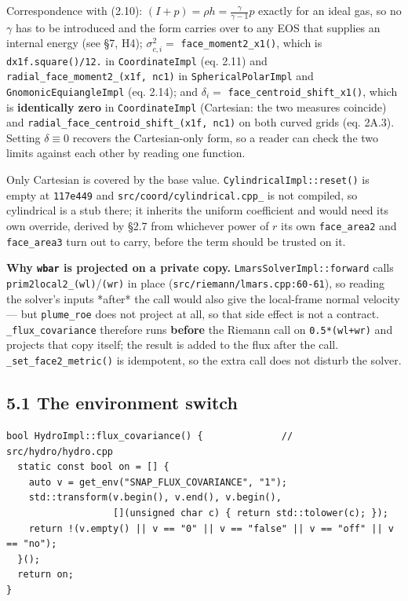 \documentclass[11pt,a4paper]{article}
\begin{document}
Correspondence with (2.10): $(I+p)=\rho h=\frac{\gamma}{\gamma-1}p$ exactly for an
ideal gas, so no $\gamma$ has to be introduced and the form carries over to any
EOS that supplies an internal energy (see §7, H4);
$\sigma^2_{c,i}=$ \texttt{face\_moment2\_x1()}, which is \texttt{dx1f.square()/12.} in
\texttt{CoordinateImpl} (eq. 2.11) and \texttt{radial\_face\_moment2\_(x1f, nc1)} in
\texttt{SphericalPolarImpl} and \texttt{GnomonicEquiangleImpl} (eq. 2.14); and
$\delta_i=$ \texttt{face\_centroid\_shift\_x1()}, which is \textbf{identically zero} in
\texttt{CoordinateImpl} (Cartesian: the two measures coincide) and
\texttt{radial\_face\_centroid\_shift\_(x1f, nc1)} on both curved grids (eq. 2A.3). Setting
$\delta\equiv0$ recovers the Cartesian-only form, so a reader can check the two
limits against each other by reading one function.

Only Cartesian is covered by the base value. \texttt{CylindricalImpl::reset()} is empty
at \texttt{117e449} and \texttt{src/coord/cylindrical.cpp\_} is not compiled, so cylindrical is
a stub there; it inherits the uniform coefficient and would need its own
override, derived by §2.7 from whichever power of $r$ its own \texttt{face\_area2} and
\texttt{face\_area3} turn out to carry, before the term should be trusted on it.

\textbf{Why \texttt{wbar} is projected on a private copy.} \texttt{LmarsSolverImpl::forward} calls
\texttt{prim2local2\_(wl)}/\texttt{(wr)} in place (\texttt{src/riemann/lmars.cpp:60-61}), so reading
the solver's inputs *after* the call would also give the local-frame normal
velocity — but \texttt{plume\_roe} does not project at all, so that side effect
is not a contract. \texttt{\_flux\_covariance} therefore runs \textbf{before} the Riemann call
on \texttt{0.5*(wl+wr)} and projects that copy itself; the result is added to the flux
after the call. \texttt{\_set\_face2\_metric()} is idempotent, so the extra call does not
disturb the solver.

\subsection*{5.1 The environment switch}

\begin{lstlisting}
bool HydroImpl::flux_covariance() {              // src/hydro/hydro.cpp
  static const bool on = [] {
    auto v = get_env("SNAP_FLUX_COVARIANCE", "1");
    std::transform(v.begin(), v.end(), v.begin(),
                   [](unsigned char c) { return std::tolower(c); });
    return !(v.empty() || v == "0" || v == "false" || v == "off" || v == "no");
  }();
  return on;
}
\end{lstlisting}
\end{document}
